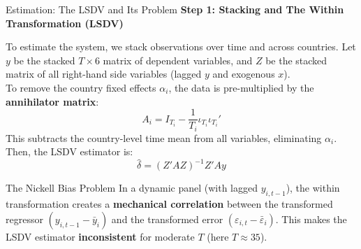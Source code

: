 \documentclass[10pt, aspectratio=169]{beamer}
\begin{document}
\begin{frame}{Estimation: The LSDV and Its Problem}
\textbf{Step 1: Stacking and The Within Transformation (LSDV)}

To estimate the system, we stack observations over time and across countries. Let $y$ be the stacked $T \times 6$ matrix of dependent variables, and $Z$ be the stacked matrix of all right-hand side variables (lagged $y$ and exogenous $x$).
\\

To remove the country fixed effects $\alpha_i$, the data is pre-multiplied by the \textbf{annihilator matrix}:
\[
A_i = I_{T_i} - \frac{1}{T_i} \iota_{T_i} \iota_{T_i}'
\]
This subtracts the country-level time mean from all variables, eliminating $\alpha_i$. Then, the LSDV estimator is:
\[
\hat{\delta} = (Z'AZ)^{-1}Z'Ay
\]

\begin{alertblock}{The Nickell Bias Problem}
In a dynamic panel (with lagged $y_{i,t-1}$), the within transformation creates a \textbf{mechanical correlation} between the transformed regressor $(y_{i,t-1} - \bar{y}_i)$ and the transformed error $(\varepsilon_{i,t} - \bar{\varepsilon}_i)$. This makes the LSDV estimator \textbf{inconsistent} for moderate $T$ (here $T \approx 35$).
\end{alertblock}
\end{frame}
\end{document}
